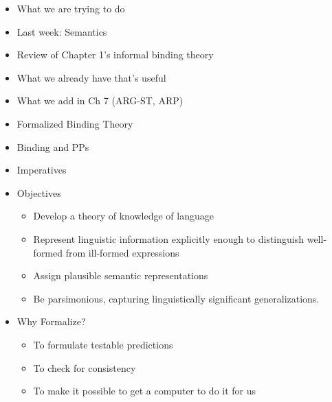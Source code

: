 \documentclass[a4paper,landscape,headrule,footrule]{foils}
\begin{document}
\maketitle


\begin{itemize}
\item What we are trying to do
\item Last week: Semantics
\item Review of Chapter 1's informal binding theory
\item What we already have that’s useful
\item What we add in Ch 7 (ARG-ST, ARP)
\item Formalized Binding Theory
\item Binding and PPs
\item Imperatives
\end{itemize}



\begin{itemize}
\item Objectives
\begin{itemize}
\item Develop a theory of knowledge of language
\item Represent linguistic information explicitly enough to
distinguish well-formed from ill-formed expressions
\item Assign plausible semantic representations
\item Be parsimonious, capturing linguistically significant
generalizations.
\end{itemize}
\item Why Formalize?
\begin{itemize}
\item To formulate testable predictions
\item To check for consistency
\item To make it possible to get a computer to do it for us
\end{itemize}
\end{itemize}
\end{document}
